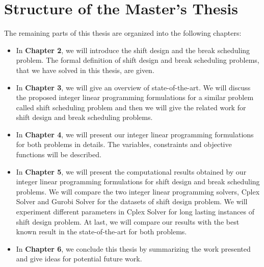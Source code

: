 \section{Structure of the Master's Thesis}

The remaining parts of this thesis are organized into the following chapters: 

\begin{itemize}
\item In \textbf{Chapter 2}, we will introduce the shift design and the break scheduling problem. The formal definition of shift design and break scheduling problems, that we have solved in this thesis, are given. 

\item In \textbf{Chapter 3}, we will give an overview of state-of-the-art. We will discuss the proposed integer linear programming formulations for a similar problem called shift scheduling problem and then we will give the related work for shift design and break scheduling problems. 

\item In \textbf{Chapter 4}, we will present our integer linear programming formulations for both problems in details. The variables, constraints and objective functions will be described. 

\item In \textbf{Chapter 5}, we will present the computational results obtained by our integer linear programming formulations for shift design and break scheduling problems. We will compare the two integer linear programming solvers, Cplex Solver and Gurobi Solver for the datasets of shift design problem. We will experiment different parameters in Cplex Solver for long lasting instances of shift design problem. At last, we will compare our results with the best known result in the state-of-the-art for both problems.

\item In \textbf{Chapter 6}, we conclude this thesis by summarizing the work presented and give ideas for potential future work.

\end{itemize}